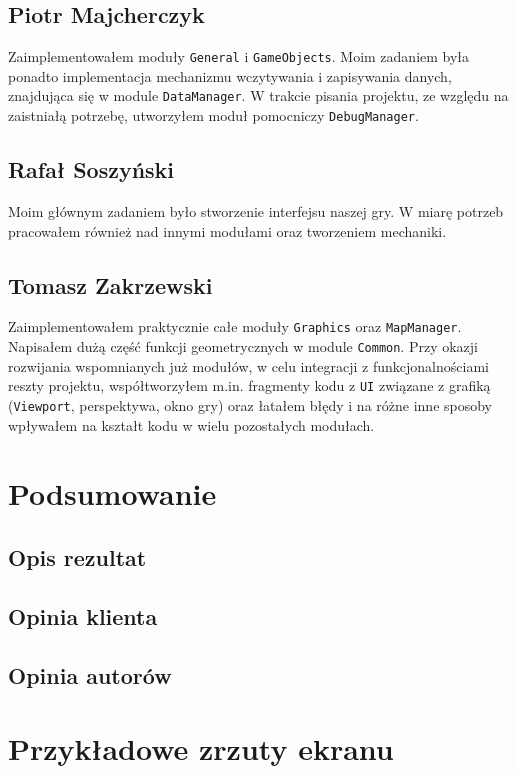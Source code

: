\documentclass[licencjacka]{pracamgr}
\begin{document}
  \section{Piotr Majcherczyk}
  Zaimplementowałem moduły \texttt{General} i \texttt{GameObjects}. Moim zadaniem była ponadto implementacja
  mechanizmu wczytywania i zapisywania danych, znajdująca się w module \texttt{DataManager}. W trakcie pisania
  projektu, ze względu na zaistniałą potrzebę, utworzyłem moduł pomocniczy \texttt{DebugManager}.

  \section{Rafał Soszyński}
  Moim głównym zadaniem było stworzenie interfejsu naszej gry. W miarę potrzeb pracowałem również nad innymi modułami
  oraz tworzeniem mechaniki.

  \section{Tomasz Zakrzewski}
  Zaimplementowałem praktycznie całe moduły \texttt{Graphics} oraz \texttt{MapManager}. Napisałem dużą część funkcji
  geometrycznych w module \texttt{Common}. Przy okazji rozwijania wspomnianych już modułów, w celu integracji z
  funkcjonalnościami reszty projektu, współtworzyłem m.in. fragmenty kodu z \texttt{UI} związane z grafiką
  (\texttt{Viewport}, perspektywa, okno gry) oraz łatałem błędy i na różne inne sposoby wpływałem na kształt kodu w
  wielu pozostałych modułach.

\chapter{Podsumowanie}

  \section{Opis rezultat}

  \section{Opinia klienta}

  \section{Opinia autorów}

\appendix

\chapter{Przykładowe zrzuty ekranu}
\end{document}
